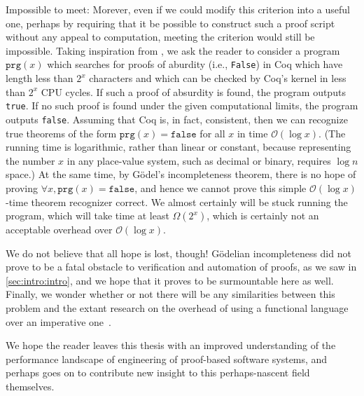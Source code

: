 Impossible to meet:
Morever, even if we could modify this criterion into a useful one, perhaps by requiring that it be possible to construct such a proof script without any appeal to computation, meeting the criterion would still be impossible.
Taking inspiration from \textcite[pp.~24--25]{Logical2016Garrabrant}, we ask the reader to consider a program $\texttt{prg}(x)$ which searches for proofs of aburdity (i.e., \texttt{False}) in Coq which have length less than $2^x$ characters and which can be checked by Coq's kernel in less than $2^x$ CPU cycles.
If such a proof of absurdity is found, the program outputs \texttt{true}.
If no such proof is found under the given computational limits, the program outputs \texttt{false}.
Assuming that Coq is, in fact, consistent, then we can recognize true theorems of the form $\texttt{prg}(x) = \texttt{false}$ for all $x$ in time $\mathcal O(\log x)$.
(The running time is logarithmic, rather than linear or constant, because representing the number $x$ in any place-value system, such as decimal or binary, requires $\log n$ space.)
At the same time, by G\"odel's incompleteness theorem, there is no hope of proving $\forall x, \texttt{prg}(x) = \texttt{false}$, and hence we cannot prove this simple $\mathcal O(\log x)$-time theorem recognizer correct.
We almost certainly will be stuck running the program, which will take time at least $\Omega(2^x)$, which is certainly not an acceptable overhead over $\mathcal O(\log x)$.

We do not believe that all hope is lost, though!
G\"odelian incompleteness did not prove to be a fatal obstacle to verification and automation of proofs, as we saw in \autoref{sec:intro:intro}, and we hope that it proves to be surmountable here as well.
Finally, we wonder whether or not there will be any similarities between this problem and the extant research on the overhead of using a functional language over an imperative one~\cite{Efficiency2010Campbell,Ben-AmramG92,Ben-amram96noteson,More1997Bird,okasaki1996purely,okasaki1998purely,Pure1997Pippenger}.


We hope the reader leaves this thesis with an improved understanding of the performance landscape of engineering of proof-based software systems, and perhaps goes on to contribute new insight to this perhaps-nascent field themselves.

